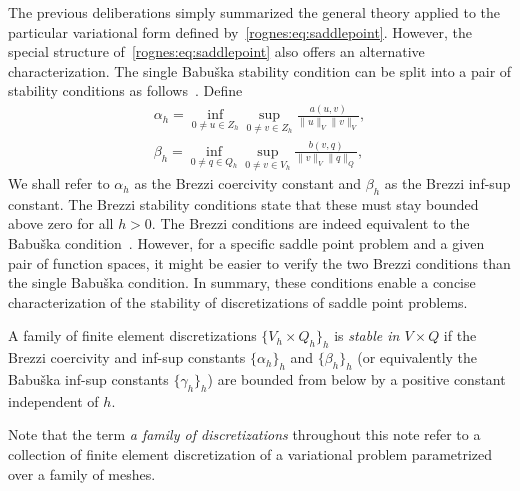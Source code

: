 The previous deliberations simply summarized the general theory
applied to the particular variational form defined
by~\eqref{rognes:eq:saddlepoint}. However, the special structure
of~\eqref{rognes:eq:saddlepoint} also offers an alternative
characterization. The single Babu\v ska stability condition can be split
into a pair of stability conditions as
follows~\cite{Brezzi1974}. Define
\begin{align}
  \label{rognes:eq:brezzi:coercivity}
  \alpha_h =
  \inf_{0 \not = u \in Z_h}
  \sup_{0 \not = v \in Z_h}
  \frac{a(u, v)}{\|u\|_{V} \|v\|_{V}} , \\
  \label{rognes:eq:brezzi:infsup}
  \beta_h =
  \inf_{0 \not = q \in Q_h}
  \sup_{0 \not = v \in V_h}
  \frac{b(v, q)}
       {\|v\|_{V} \|q\|_{Q}},
\end{align}
We shall refer to $\alpha_h$ as the Brezzi coercivity constant and
$\beta_h$ as the Brezzi inf-sup constant. The Brezzi stability
conditions state that these must stay bounded above zero for all $h >
0$. The Brezzi conditions are indeed equivalent to the Babu\v ska
condition~\cite{Brezzi1974}. However, for a specific saddle point
problem and a given pair of function spaces, it might be easier to
verify the two Brezzi conditions than the single Babu\v ska condition.
In summary, these conditions enable a concise characterization of the
stability of discretizations of saddle point problems.
\begin{definition}
  \label{rognes:def:stable}
  A family of finite element discretizations $\{V_h \times Q_h\}_h$ is
  \emph{stable in $V \times Q$} if the Brezzi coercivity and inf-sup
  constants $\{ \alpha_h \}_h $ and $\{ \beta_h \}_h$ (or equivalently
  the Babu\v{s}ka inf-sup constants $\{ \gamma_h \}_h$) are bounded
  from below by a positive constant independent of $h$.
\end{definition}
Note that the term \emph{a family of discretizations} throughout this
note refer to a collection of finite element discretization of a
variational problem parametrized over a family of meshes.



